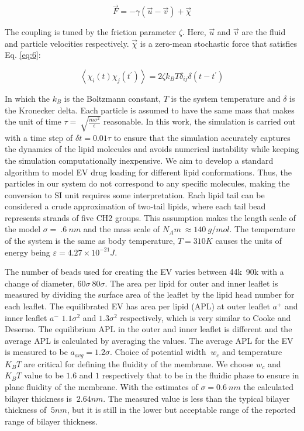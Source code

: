 \vspace{0.5cm}
\begin{equation}\label{eq:5}
\vec{F}=-\gamma\left(\vec{u}-\vec{v}\right)+\vec{\chi}
\end{equation}
\vspace{0.5cm}

The coupling is tuned by the friction parameter $\zeta$. Here, $\vec{u}$ and $\vec{v}$ are the fluid and particle velocities respectively. $\vec{\chi}$ is a zero-mean stochastic force that satisfies Eq. \ref{eq:6}:

\vspace{0.5cm}
\begin{equation}\label{eq:6}
\left\langle\chi_i(t)\chi_j\left(t^\prime\right)\right\rangle=2\zeta k_BT\delta_{ij}\delta\left(t-t^\prime\right)
\end{equation}
\vspace{0.5cm}

In which the $k_B$ is the Boltzmann constant, $T$ is the system temperature and $\delta$ is the Kronecker delta. Each particle is assumed to have the same mass that makes the unit of time $\tau=\ \sqrt{\frac{m\sigma^2}{\epsilon}}$ reasonable. In this work, the simulation is carried out with a time step of $\delta t=0.01\tau$ to ensure that the simulation accurately captures the dynamics of the lipid molecules and avoids numerical instability while keeping the simulation computationally inexpensive. We aim to develop a standard algorithm to model EV drug loading for different lipid conformations. Thus, the particles in our system do not correspond to any specific molecules, making the conversion to SI unit requires some interpretation. Each lipid tail can be considered a crude approximation of two-tail lipids, where each tail bead represents strands of five CH2 groups. This assumption makes the length scale of the model $\sigma=\ .6\ nm$ and the mass scale of $N_Am\ \approx140\ g/mol$. The temperature of the system is the same as body temperature, $T = 310 K$ causes the units of energy being $\varepsilon=4.27\times{10}^{-21}J$. 

The number of beads used for creating the EV varies between 44k~90k with a change of diameter, $60\sigma ~80\sigma$. The area per lipid for outer and inner leaflet is measured by dividing the surface area of the leaflet by the lipid head number for each leaflet. The equilibrated EV has area per lipid (APL) at outer leaflet $a^+$ and inner leaflet $a^-$ $1.1\sigma^2$ and $1.3\sigma^2$ respectively, which is very similar to Cooke and Deserno\cite{a55}. The equilibrium APL in the outer and inner leaflet is different and the average APL is calculated by averaging the values. The average APL for the EV is measured to be $a_{avg} = 1.2\sigma$. Choice of potential width  $\ w_c$ and temperature $K_BT$ are critical for defining the fluidity of the membrane. We choose $w_c$ and $K_BT$ value to be $1.6$ and $1$ respectively that to be in the fluidic phase to ensure in plane fluidity of the membrane. With the estimates of $\sigma=0.6\ nm$ the calculated bilayer thickness is $~2.64 nm$. The measured value is less than the typical bilayer thickness of $~5nm$, but it is still in the lower but acceptable range of the reported range of bilayer thickness\cite{a60}.

